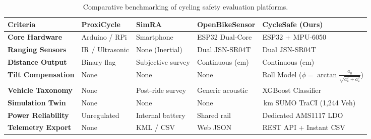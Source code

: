 \begin{table}[h!]
	\centering
	\caption{Comparative benchmarking of cycling safety evaluation platforms.}
	\label{tab:lit_comparison}
	\setlength{\tabcolsep}{5pt}
	\renewcommand{\arraystretch}{1.25}
	\begin{tabularx}{\textwidth}{|>{\raggedright\arraybackslash\bfseries}p{3.2cm}|>{\raggedright\arraybackslash}X|>{\raggedright\arraybackslash}X|>{\raggedright\arraybackslash}X|>{\raggedright\arraybackslash}X|}
		\hline
		\textbf{Criteria} & \textbf{ProxiCycle} & \textbf{SimRA} & \textbf{OpenBikeSensor} & \textbf{CycleSafe (Ours)} \\
		\hline
		\hline
		Core Hardware & Arduino / RPi & Smartphone & ESP32 Dual-Core & ESP32 + MPU-6050 \\
		\hline
		Ranging Sensors & IR / Ultrasonic & None (Inertial) & Dual JSN-SR04T & Dual JSN-SR04T \\
		\hline
		Distance Output & Binary flag & Subjective survey & Continuous (cm) & Continuous (cm) \\
		\hline
		Tilt Compensation & None & None & None & Roll Model ($\phi = \arctan\frac{a_y}{\sqrt{a_x^2+a_z^2}}$) \\
		\hline
		Vehicle Taxonomy & None & Post-ride survey & Generic acoustic & XGBoost Classifier \\
		\hline
		Simulation Twin & None & None & None & 10\,km SUMO TraCI (1,244 Veh) \\
		\hline
		Power Reliability & Unregulated & Internal battery & Shared rail & Dedicated AMS1117 LDO \\
		\hline
		Telemetry Export & None & KML / CSV & Web JSON & REST API + Instant CSV \\
		\hline
	\end{tabularx}
\end{table}

